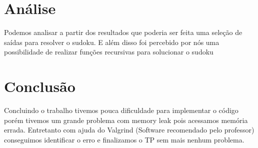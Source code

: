 \documentclass{article}
\begin{document}
\section{Análise}
Podemos analisar a partir dos resultados que poderia ser feita uma seleção de saídas para resolver o sudoku. E além disso foi percebido por nós uma possibilidade de realizar funções recursivas para solucionar o sudoku
\section{Conclusão}
Concluindo o trabalho tivemos pouca dificuldade para implementar o código porém tivemos um grande problema com memory leak pois acessamos memória errada. Entretanto com ajuda do Valgrind (Software recomendado pelo professor) conseguimos identificar o erro e finalizamos o TP sem mais nenhum problema. 
\end{document}
